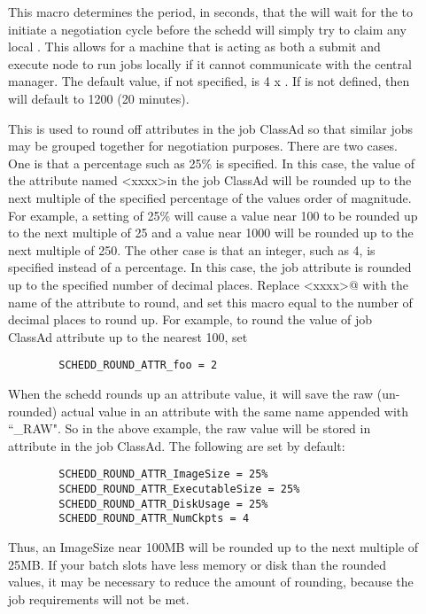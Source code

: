 \begin{description}
\item[]
  \label{param:ScheddAssumeNegotiatorGone} This macro determines the period,
  in seconds, that the  will wait for the  to
  initiate a negotiation cycle before the schedd will simply try to claim
  any local .  This allows for a machine that is acting as
  both a submit and execute node to run jobs locally if it cannot
  communicate with the central manager.  The default value, if not
  specified, is 4 x .  If
   is not defined, then 
   will default to 1200 (20
  minutes).

\item[]
  \label{param:ScheddRoundAttr} This is used to round off attributes in
  the job ClassAd so that similar jobs may be grouped together for
  negotiation purposes.  There are two cases.  One is that a
  percentage such as 25\% is specified.  In this case, the value of
  the attribute named \verb@<xxxx>\@ in the job ClassAd will be
  rounded up to the next multiple of the specified percentage of the
  values order of magnitude.  For example, a setting of 25\% will
  cause a value near 100 to be rounded up to the next multiple of 25
  and a value near 1000 will be rounded up to the next multiple of
  250.  The other case is that an integer, such as 4, is specified
  instead of a percentage.  In this case, the job attribute is rounded
  up to the specified number of decimal places.
  Replace \verb@<xxxx>@ with the name of the attribute to round, and set this
  macro equal to the number of decimal places to round up.  For example, to
  round the value of job ClassAd attribute   up to the nearest
  100, set 
\begin{verbatim}
        SCHEDD_ROUND_ATTR_foo = 2
\end{verbatim}
  When the schedd rounds up an attribute value, it will save the raw 
  (un-rounded) actual value in an attribute with the same name appended
  with ``\_RAW".  So in the above example, the raw value will be stored
  in attribute  in the job ClassAd.
  The following are set by default:
\begin{verbatim}
        SCHEDD_ROUND_ATTR_ImageSize = 25%
        SCHEDD_ROUND_ATTR_ExecutableSize = 25%
        SCHEDD_ROUND_ATTR_DiskUsage = 25%
        SCHEDD_ROUND_ATTR_NumCkpts = 4
\end{verbatim}
  Thus, an ImageSize near 100MB will be rounded up to the next
  multiple of 25MB.  If your batch slots have less
  memory or disk than the rounded values, it may be necessary to
  reduce the amount of rounding, because the job requirements
  will not be met.


\end{description}
